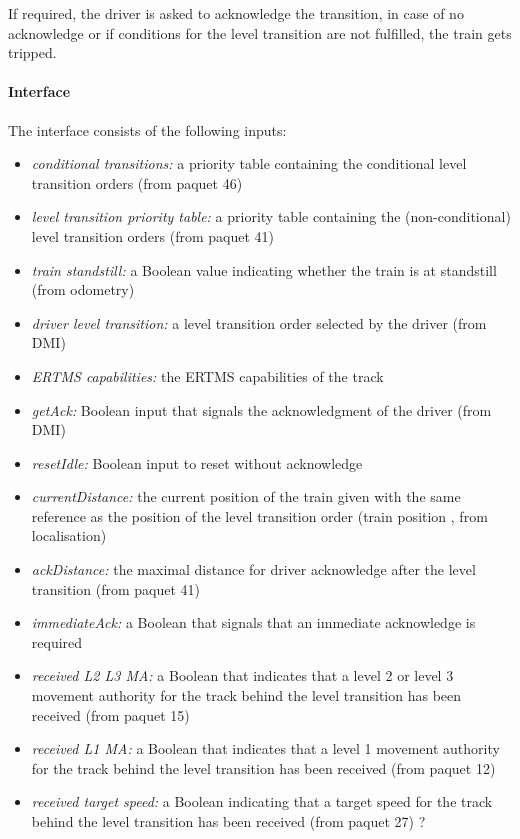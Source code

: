 If required, the driver is asked to acknowledge the transition, in case of no acknowledge or if conditions for the level transition are not fulfilled, the train gets tripped.

\paragraph{Interface}

The interface consists of the following inputs:

\begin{itemize}
\item \emph{conditional transitions:} a priority table containing the
  conditional level transition orders (from paquet 46)
\item \emph{level transition priority table:} a priority table containing the
  (non-conditional) level transition orders (from paquet 41)
\item \emph{train standstill:} a Boolean value indicating whether the train is
  at standstill (from odometry)
\item \emph{driver level transition:} a level transition order selected by the
  driver (from DMI)
\item \emph{ERTMS capabilities:} the ERTMS capabilities of the track
\item \emph{getAck:} Boolean input that signals the acknowledgment of the
  driver (from DMI)
\item \emph{resetIdle:} Boolean input to reset without acknowledge
\item \emph{currentDistance:} the current position of the train given with the
  same reference as the position of the level transition order (train position , from localisation)
\item \emph{ackDistance:} the maximal distance for driver acknowledge after
  the level transition (from paquet 41)
\item \emph{immediateAck:} a Boolean that signals that an immediate acknowledge
  is required
\item \emph{received L2 L3 MA:} a Boolean that indicates that a level 2 or level
  3 movement authority for the track behind the level transition has been
  received (from paquet 15)
\item \emph{received L1 MA:} a Boolean that indicates that a level 1 movement
  authority for the track behind the level transition has been received (from paquet 12)
\item \emph{received target speed:} a Boolean indicating that a target speed for
  the track behind the level transition has been received (from paquet 27) ?
\end{itemize}

